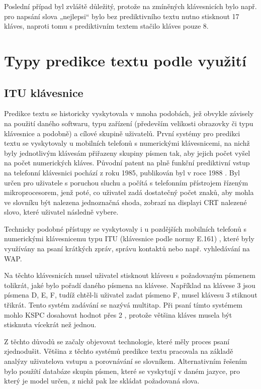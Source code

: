 \documentclass[a4paper,11pt]{article}
\newcommand{\td}[2][]{
	{\todo[size=\footnotesize]{#2}}
}
\begin{document}
Poslední případ byl zvláště důležitý, protože na zmíněných klávesnicích bylo např. pro napsání slova „nejlepsi“ bylo bez prediktivního textu nutno stisknout 17 kláves, naproti tomu s prediktivním textem stačilo kláves pouze 8. \cite{dXVv6nPb2KifFXYv}

\section{Typy predikce textu podle využití}

\subsection{ITU klávesnice}

Predikce textu se historicky vyskytovala v mnoha podobách, jež obvykle závisely na použití daného softwaru, typu zařízení (především velikosti obrazovky či typu klávesnice a podobně) a cílové skupině uživatelů. První systémy pro predikci textu se vyskytovaly u mobilních telefonů s numerickými klávesnicemi, na nichž byly jednotlivým klávesám přiřazeny skupiny písmen tak, aby jejich počet vyšel na počet numerických kláves. Původní patent na plně funkční prediktivní vstup na telefonní klávesnici pochází z roku 1985, publikován byl v roce 1988 \cite{Feinson1988}. Byl určen pro uživatele s poruchou sluchu a počítá s telefonním přístrojem řízeným mikroprocesorem, jenž poté, co uživatel zadá dostatečný počet znaků, aby mohla ve slovníku být nalezena jednoznačná shoda, zobrazí na displayi CRT nalezené slovo, které uživatel následně vybere.

Technicky podobné přístupy se vyskytovaly i u pozdějších mobilních telefonů s numerickými klávesnicemu typu ITU (klávesnice podle normy E.161) \cite{mfmtlqoxL48pMk3T}, které byly využívány na psaní krátkých zpráv, správu kontaktů nebo např. vyhledávání na WAP. 

Na těchto\td{sem bych dal nejakou ukazku z te ceske wiki} klávesnicích musel uživatel stisknout klávesu s požadovaným písmenem tolikrát, jaké bylo pořadí daného písmena na klávese. Například na klávese 3 jsou písmena D, E, F, tudíž chtěl-li uživatel zadat písmeno F, musel klávesu 3 stiknout třikrát. Tento systém zadávání se nazývá multitap. Při psaní tímto systémem mohlo KSPC dosahovat hodnot přes 2 \cite{dXVv6nPb2KifFXYv}, protože většina kláves musela být stisknuta vícekrát než jednou. 

Z těchto důvodů se začaly objevovat technologie, které měly proces psaní zjednodušit. Většina z těchto systémů predikce textu pracovala na základě analýzy uživatelova vstupu a porovnávání se slovníkem. Alternativním řešením bylo použítí databáze skupin písmen, které se vyskytují v daném jazyce, pro který je model určen, z nichž pak lze skládat požadovaná slova.
\end{document}
